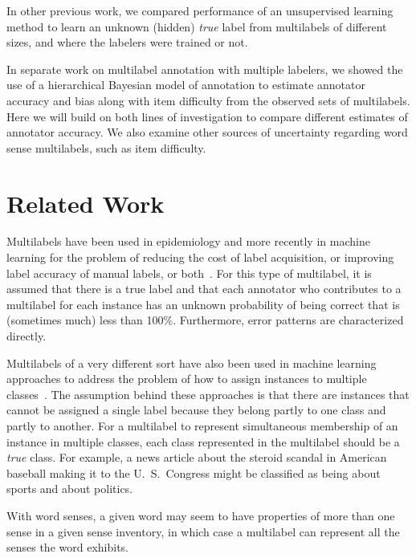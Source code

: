 \documentclass[11pt]{article}
\begin{document}
In other previous work, we compared performance of an unsupervised
learning method to learn an unknown (hidden) {\it true} label from
multilabels of different sizes, and where the labelers were trained or
not. 

In separate work on multilabel annotation with multiple labelers, we
showed the use of a hierarchical Bayesian model of annotation to
estimate annotator accuracy and bias along with item difficulty from
the observed sets of multilabels. Here we will build on both lines of
investigation to compare different estimates of annotator accuracy. We
also examine other sources of uncertainty regarding word sense
multilabels, such as item difficulty.

\section{Related Work} %

Multilabels have been used in epidemiology and more recently in
machine learning for the problem of reducing the cost of label
acquisition, or improving label accuracy of manual labels, or
both~\cite{dawidSkene79,snowEtAl08,shengEtAl_2008}. For this type of
multilabel, it is assumed that there is a true label and that each
annotator who contributes to a multilabel for each instance has an
unknown probability of being correct that is (sometimes much) less
than 100\%.  Furthermore, error patterns are characterized directly.

Multilabels of a very different sort have also been used in machine
learning approaches to address the problem of how to assign instances
to multiple
classes~\cite{tsoumakas&katakis_2007,boutellEtAl_2004,mccallum_1999}.
The assumption behind these approaches is that there are instances
that cannot be assigned a single label because they belong partly to
one class and partly to another. For a multilabel to represent
simultaneous membership of an instance in multiple classes, each class
represented in the multilabel should be a {\it true} class.  For
example, a news article about the steroid scandal in American baseball
making it to the U.~S.~Congress might be classified as being about
sports and about politics.

With word senses, a given word may seem to have properties of more
than one sense in a given sense inventory, in which case a multilabel
can represent all the senses the word exhibits. 
\end{document}
